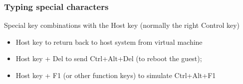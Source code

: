 \begin{frame}
\frametitle{Typing special characters}

Special key combinations with the \alert{Host key} (normally the 
\alert{right Control key}) 
\begin{itemize}
\item \alert{Host key} to return back to host system from virtual machine
\item \alert{Host key + Del} to send Ctrl+Alt+Del (to reboot the guest);
\item \alert{Host key + F1} (or other function keys) to simulate Ctrl+Alt+F1
\end{itemize}
\end{frame}
